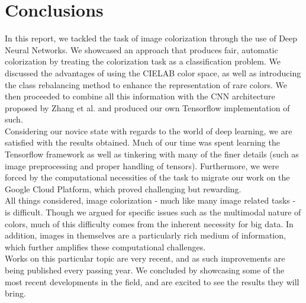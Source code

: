 \documentclass[twoside,twocolumn]{article}
\begin{document}

\newpage

\section{Conclusions}

In this report, we tackled the task of image colorization through the use of Deep Neural Networks. We showcased an approach that produces fair, automatic colorization by treating the colorization task as a classification problem. We discussed the advantages of using the CIELAB color space, as well as introducing the class rebalancing method to enhance the representation of rare colors. We then proceeded to combine all this information with the CNN architecture proposed by Zhang et al. \cite{Zhang:2016} and produced our own Tensorflow implementation of such.\\
Considering our novice state with regards to the world of deep learning, we are satisfied with the results obtained. Much of our time was spent learning the Tensorflow framework as well as tinkering with many of the finer details (such as image preprocessing and proper handling of tensors). Furthermore, we were forced by the computational necessities of the task to migrate our work on the Google Cloud Platform, which proved challenging but rewarding.\\
All things considered, image colorization - much like many image related tasks - is difficult. Though we argued for specific issues such as the multimodal nature of colors, much of this difficulty comes from the inherent necessity for big data. In addition, images in themselves are a particularly rich medium of information, which further amplifies these computational challenges.\\
Works on this particular topic are very recent, and as such improvements are being published every passing year. We concluded by showcasing some of the most recent developments in the field, and are excited to see the results they will bring.




\newpage
\end{document}
